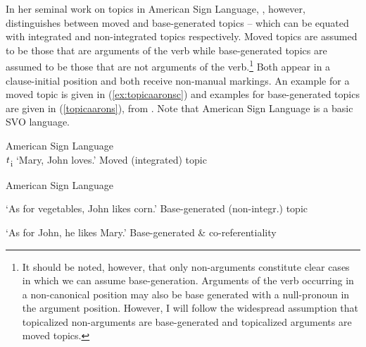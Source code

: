 In her seminal work on topics in American Sign Language, \citet{aarons1994aspects, aarons1996topics}, however, distinguishes between moved and base-generated topics -- which can be equated with integrated and non-integrated topics respectively. Moved topics are assumed to be those that are arguments of the verb while base-generated topics are assumed to be those that are not arguments of the verb.\footnote{It should be noted, however, that only non-arguments constitute clear cases in which we can assume base-generation. Arguments of the verb occurring in a non-canonical position may also be base generated with a null-pronoun in the argument position. However, I will follow the widespread assumption that topicalized non-arguments are base-generated and topicalized arguments are moved topics.} Both appear in a clause-initial position and both receive non-manual markings. An example for a moved topic is given in (\ref{ex:topicaaronsc}) and examples for base-generated topics are given in (\ref{topicaarons}), from \citet{aarons1996topics}. Note that American Sign Language is a basic SVO language.

\begin{exe}
\ex American Sign Language \\   $\textrm{\textit{t}}$\textsubscript{i}
\glt `Mary, John loves.' \label{ex:topicaaronsc} \hfill Moved (integrated) topic
\end{exe} 


\begin{exe}
\ex American Sign Language \label{topicaarons}\begin{xlist} 
\ex {} 

\glt `As for vegetables, John likes corn.' \label{ex:topicaaronsa} \hfill Base-generated (non-integr.) topic

\ex {} 

\glt `As for John, he likes Mary.' \label{ex:topicaaronsb} \hfill Base-generated \& co-referentiality
\end{xlist}
\end{exe} 

